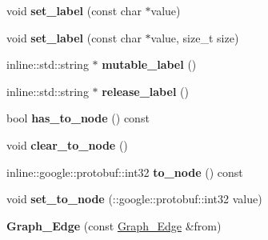 \begin{DoxyCompactItemize}
\item 
\hypertarget{classgraph_1_1Graph__Edge_a5e28d3ae41aa291b904c97f8086e6599}{
void {\bfseries set\_\-label} (const char $\ast$value)}
\label{classgraph_1_1Graph__Edge_a5e28d3ae41aa291b904c97f8086e6599}

\item 
\hypertarget{classgraph_1_1Graph__Edge_ab5e92ddc8c7a81e0e7689cb86dac75ce}{
void {\bfseries set\_\-label} (const char $\ast$value, size\_\-t size)}
\label{classgraph_1_1Graph__Edge_ab5e92ddc8c7a81e0e7689cb86dac75ce}

\item 
\hypertarget{classgraph_1_1Graph__Edge_a35d039789edd950847ab757c9b0ef07a}{
inline::std::string $\ast$ {\bfseries mutable\_\-label} ()}
\label{classgraph_1_1Graph__Edge_a35d039789edd950847ab757c9b0ef07a}

\item 
\hypertarget{classgraph_1_1Graph__Edge_ab85ac3ad8bb604fa41030a547b2763ec}{
inline::std::string $\ast$ {\bfseries release\_\-label} ()}
\label{classgraph_1_1Graph__Edge_ab85ac3ad8bb604fa41030a547b2763ec}

\item 
\hypertarget{classgraph_1_1Graph__Edge_af80c945f9d34527de487207bc9553776}{
bool {\bfseries has\_\-to\_\-node} () const }
\label{classgraph_1_1Graph__Edge_af80c945f9d34527de487207bc9553776}

\item 
\hypertarget{classgraph_1_1Graph__Edge_a10c4766efe37b9ebf33d94e58f5d34d1}{
void {\bfseries clear\_\-to\_\-node} ()}
\label{classgraph_1_1Graph__Edge_a10c4766efe37b9ebf33d94e58f5d34d1}

\item 
\hypertarget{classgraph_1_1Graph__Edge_aedbaf240950d5029ab5c13a1b09c19e1}{
inline::google::protobuf::int32 {\bfseries to\_\-node} () const }
\label{classgraph_1_1Graph__Edge_aedbaf240950d5029ab5c13a1b09c19e1}

\item 
\hypertarget{classgraph_1_1Graph__Edge_a61b1469e26d71c6b2673a6a3da5a057f}{
void {\bfseries set\_\-to\_\-node} (::google::protobuf::int32 value)}
\label{classgraph_1_1Graph__Edge_a61b1469e26d71c6b2673a6a3da5a057f}

\item 
\hypertarget{classgraph_1_1Graph__Edge_a1b8cdd9aa0720a4b78149954fb109810}{
{\bfseries Graph\_\-Edge} (const \hyperlink{classgraph_1_1Graph__Edge}{Graph\_\-Edge} \&from)}
\label{classgraph_1_1Graph__Edge_a1b8cdd9aa0720a4b78149954fb109810}


\end{DoxyCompactItemize}
